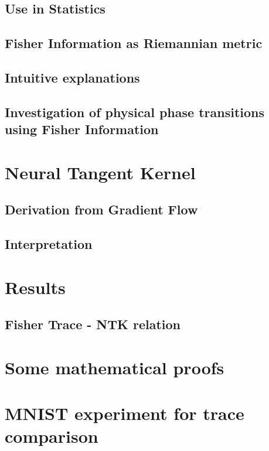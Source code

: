 \documentclass[12pt, a4paper]{report}
\begin{document}
	\section{Use in Statistics}\label{sec:FIinStatistics}
	
	\section{Fisher Information as Riemannian metric}
	
	\section{Intuitive explanations}\label{sec:FisherInterpretation}
	
	\section{Investigation of physical phase transitions using Fisher Information}
	
	
	
	\chapter{Neural Tangent Kernel}\label{sec:ChapterNTK}
	\section{Derivation from Gradient Flow}
	
	\section{Interpretation}
	
	
	\chapter{Results}
	\section{Fisher Trace - NTK relation}
	
	
	
	
	\nocite{*}
	\printbibliography[title=Literature]
	\begin{appendices}
		\chapter{Some mathematical proofs}
		
		\chapter{MNIST experiment for trace comparison}
		\label{sec:TraceExperimentAppendix}
		
	\end{appendices}
	
\end{document}
